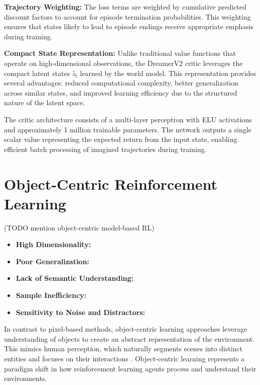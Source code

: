 \documentclass[
	english,
	ruledheaders=section,
	class=report,
	thesis={type=master},
	accentcolor=9c,
	custommargins=true,
	marginpar=false,
	parskip=half-,
	fontsize=11pt,
]{tudapub}
\begin{document}
\textbf{Trajectory Weighting:} The loss terms are weighted by cumulative predicted discount factors to account for episode termination probabilities. This weighting ensures that states likely to lead to episode endings receive appropriate emphasis during training.

\textbf{Compact State Representation:} Unlike traditional value functions that operate on high-dimensional observations, the DreamerV2 critic leverages the compact latent states $\hat{z}_t$ learned by the world model. This representation provides several advantages: reduced computational complexity, better generalization across similar states, and improved learning efficiency due to the structured nature of the latent space.

The critic architecture consists of a multi-layer perceptron with ELU
activations and approximately 1 million trainable parameters. The network
outputs a single scalar value representing the expected return from the input
state, enabling efficient batch processing of imagined trajectories during
training.



\section{Object-Centric Reinforcement Learning}
\label{sec:object_centric_rl}
(TODO mention object-centric model-based RL)

\begin{itemize}
	\item \textbf{High Dimensionality:}
	\item \textbf{Poor Generalization:}
	\item \textbf{Lack of Semantic Understanding:}
	\item \textbf{Sample Inefficiency:}
	\item \textbf{Sensitivity to Noise and Distractors:}
\end{itemize}

In contrast to pixel-based methods, object-centric learning approaches leverage
understanding of objects to create an abstract representation of the
environment. This mimics human perception, which naturally segments scenes into
distinct entities and focuses on their interactions
\cite{nanbo2021learningobjectcentricrepresentationsmultiobject}. Object-centric
learning represents a paradigm shift in how reinforcement learning agents
process and understand their environments.
\end{document}
